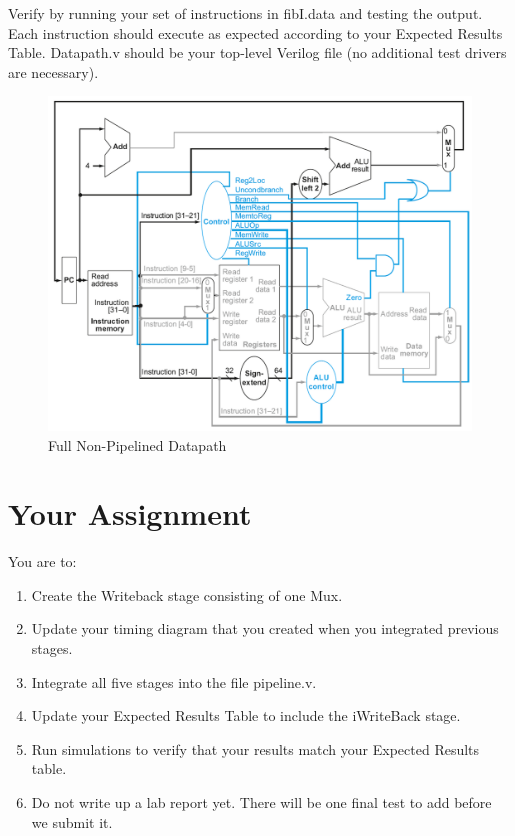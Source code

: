 Verify by running your set of instructions in fibI.data and testing the output.  Each instruction should execute as expected according to your Expected Results Table.  Datapath.v should be your top-level Verilog file (no additional test drivers are necessary).

\begin{figure}
\caption{Full Non-Pipelined Datapath}\label{fig:datapath}
\begin{center}
\includegraphics[width=\textwidth]{../images/non_pipelined_datapath.png}
\end{center}
\end{figure}

\section{Your Assignment}

You are to:
\begin{enumerate}
\item Create the Writeback stage consisting of one Mux.
\item Update your timing diagram that you created when you integrated previous stages.
\item Integrate all five stages into the file pipeline.v.
\item Update your Expected Results Table to include the iWriteBack stage.
\item Run simulations to verify that your results match your Expected Results table.   
\item Do not write up a lab report yet. There will be one final test to add before we submit it.
\end{enumerate} 
